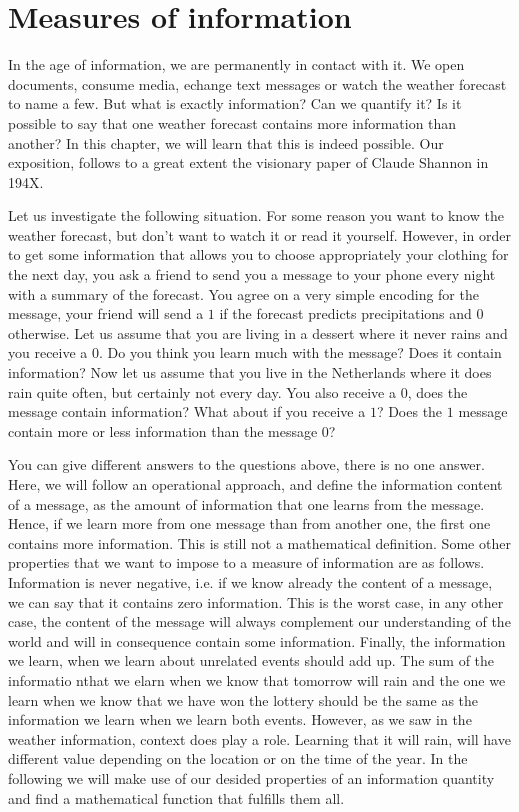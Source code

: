 \chapter{Measures of information}
In the age of information, we are permanently in contact with it.
We open documents, consume media, echange text messages or watch the weather forecast to name a few.
But what is exactly information? Can we quantify it? Is it possible to say that
one weather forecast contains more information than another? In this chapter,
we will learn that this is indeed possible. Our exposition, follows to a great
extent the visionary paper of Claude Shannon in 194X.

\begin{exercise}
Let us investigate the following situation. For some reason you want to know the weather forecast, but don't want to watch it or read it yourself. However, in order to get some information that allows you to choose appropriately your clothing for the next day, you ask a friend to send you a message to your phone every night with a summary of the forecast. You agree on a very simple encoding for the message, your friend will send a $1$ if the forecast predicts precipitations and $0$ otherwise. Let us assume that you are living in a dessert where it never rains and you receive a $0$. Do you think you learn much with the message? Does it contain information? Now let us assume that you live in the Netherlands where it does rain quite often, but certainly not every day. You also receive a $0$, does the message contain information? What about if you receive a $1$? Does the $1$ message contain more or less information than the message $0$? 
\end{exercise}

You can give different answers to the questions above, there is no one answer. 
Here, we will follow an operational approach, and define the information content of a message, as the amount of information that one learns from the message. Hence, if we learn more from one message than from another one, the first one contains more information.
This is still not a mathematical definition. 
Some other properties that we want to impose to a measure of information are as follows. 
Information is never negative, i.e. if we know already the content of a message, we can say that it contains zero information. 
This is the worst case, in any other case, the content of the message will always complement our understanding of the world and will in consequence contain some information. 
Finally, the information we learn, when we learn about unrelated events should add up. 
The sum of the informatio nthat we elarn when we know that tomorrow will rain and the one we learn when we know that we have won the lottery should be the same as the information we learn when we learn both events. However, as we saw in the weather information, context does play a role. Learning that it will rain, will have different value depending on the location or on the time of the year. In the following we will make use of our desided properties of an information quantity and find a mathematical function that fulfills them all.

